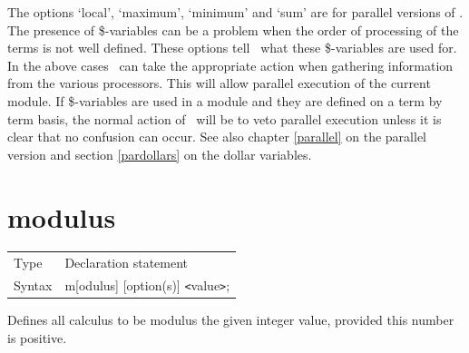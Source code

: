 

\noindent The options `local', `maximum', `minimum' and `sum' are for 
parallel versions of \FORM\@. The presence of \$-variables can be a problem 
when the order of processing of the terms is not well defined. These 
options tell \FORM\ what these \$-variables are used for. In the above 
cases \FORM\ can take the appropriate action when gathering information 
from the various processors. This will allow
parallel execution of the current module. If
\$-variables are used in a module and they are defined on a term by term
basis, the normal action of \FORM\ will be to veto parallel execution unless
it is clear that no confusion can occur. See also chapter \ref{parallel} on
the parallel version and section \ref{pardollars} on the dollar variables.\vspace{10mm}

 
\section{modulus}
\label{substamodulus}

\noindent \begin{tabular}{ll}
Type & Declaration statement\\
Syntax & m[odulus] [option(s)] {\tt<}value{\tt>};
\end{tabular} \vspace{4mm}

\noindent Defines all calculus to be modulus the given 
integer value, provided this number is positive.


